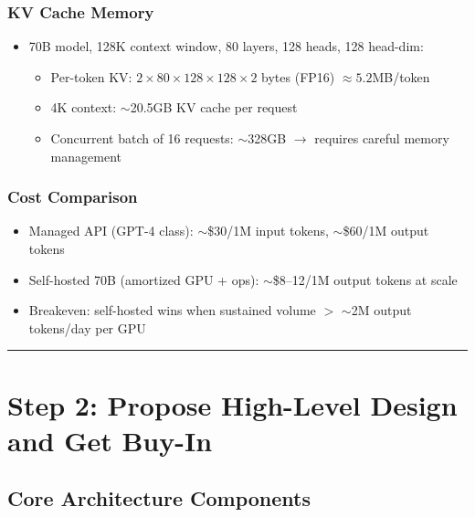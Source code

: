 \subsubsection*{KV Cache Memory}

\begin{itemize}
  \item 70B model, 128K context window, 80 layers, 128 heads, 128 head-dim:
  \begin{itemize}
    \item Per-token KV: $2 \times 80 \times 128 \times 128 \times 2$ bytes (FP16) $\approx 5.2$MB/token
    \item 4K context: $\sim$20.5GB KV cache per request
    \item Concurrent batch of 16 requests: $\sim$328GB $\rightarrow$ requires careful memory management
  \end{itemize}
\end{itemize}

\subsubsection*{Cost Comparison}

\begin{itemize}
  \item Managed API (GPT-4 class): $\sim$\$30/1M input tokens, $\sim$\$60/1M output tokens
  \item Self-hosted 70B (amortized GPU + ops): $\sim$\$8--12/1M output tokens at scale
  \item Breakeven: self-hosted wins when sustained volume $>$ $\sim$2M output tokens/day per GPU
\end{itemize}

\bigskip\hrule\bigskip

\section*{Step 2: Propose High-Level Design and Get Buy-In}

\subsection*{Core Architecture Components}

